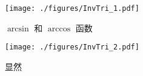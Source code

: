 
\begin{figure}[ht]
\centering
\texttt{[image: ./figures/InvTri\_1.pdf]}
\caption{$\arcsin$ 和 $\arccos$ 函数} \label{InvTri_fig1}
\end{figure}

\begin{figure}[ht]
\centering
\texttt{[image: ./figures/InvTri\_2.pdf]}
\caption{显然} \label{InvTri_fig2}
\end{figure}

